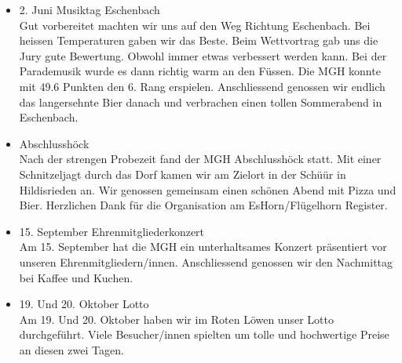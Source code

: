 \begin{history}
\begin{itemize}
            \item 2. Juni Musiktag Eschenbach\\
                  Gut vorbereitet machten wir uns auf den Weg Richtung
                  Eschenbach. Bei heissen Temperaturen gaben wir das Beste. Beim
                  Wettvortrag gab uns die Jury gute Bewertung. Obwohl immer
                  etwas verbessert werden kann. Bei der Parademusik wurde es
                  dann richtig warm an den Füssen. Die MGH konnte mit 49.6
                  Punkten den 6. Rang erspielen. Anschliessend genossen wir
                  endlich das langersehnte Bier danach und verbrachen einen
                  tollen Sommerabend in Eschenbach.

            \item Abschlusshöck\\
                  Nach der strengen Probezeit fand der MGH Abschlusshöck statt.
                  Mit einer Schnitzeljagt durch das Dorf kamen wir am Zielort in
                  der Schüür in Hildisrieden an. Wir genossen gemeinsam einen
                  schönen Abend mit Pizza und Bier. Herzlichen Dank für die
                  Organisation am EsHorn/Flügelhorn Register.

            \item  15. September Ehrenmitgliederkonzert\\
                  Am 15. September hat die MGH ein unterhaltsames Konzert
                  präsentiert vor unseren Ehrenmitgliedern/innen. Anschliessend
                  genossen wir den Nachmittag bei Kaffee und Kuchen.

            \item 19. Und 20. Oktober Lotto\\
                  Am 19. Und 20. Oktober haben wir im Roten Löwen unser Lotto
                  durchgeführt. Viele Besucher/innen spielten um tolle und
                  hochwertige Preise an diesen zwei Tagen.

      \end{itemize}

\end{history}
